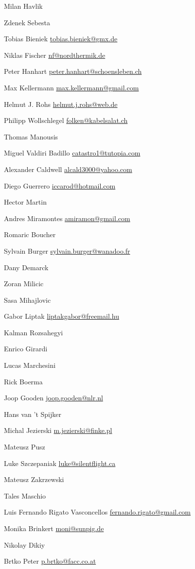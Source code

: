 \item Milan Havlik
\item*Zdenek Sebesta
\item Tobias Bieniek \url{tobias.bieniek@gmx.de}
\item Niklas Fischer \url{nf@nordthermik.de}
\item Peter Hanhart \url{peter.hanhart@schoensleben.ch}
\item Max Kellermann \url{max.kellermann@gmail.com}
\item Helmut J. Rohs \url{helmut.j.rohs@web.de}
\item Philipp Wollschlegel \url{folken@kabelsalat.ch}
\item*Thomas Manousis
\item Miguel Valdiri Badillo \url{catastro1@tutopia.com}
\item Alexander Caldwell \url{alcald3000@yahoo.com}
\item Diego Guerrero \url{iccarod@hotmail.com}
\item*Hector Martin
\item Andres Miramontes \url{amiramon@gmail.com}
\item*Romaric Boucher
\item Sylvain Burger \url{sylvain.burger@wanadoo.fr}
\item*Dany Demarck
\item*Zoran Milicic
\item*Sasa Mihajlovic
\item Gabor Liptak \url{liptakgabor@freemail.hu}
\item*Kalman Rozsahegyi
\item*Enrico Girardi
\item*Lucas Marchesini
\item*Rick Boerma
\item Joop Gooden \url{joop.gooden@nlr.nl}
\item Hans van 't Spijker
\item Michal Jezierski \url{m.jezierski@finke.pl}
\item*Mateusz Pusz
\item Luke Szczepaniak \url{luke@silentflight.ca}
\item Mateusz Zakrzewski
\item*Tales Maschio
\item Luis Fernando Rigato Vasconcellos \url{fernando.rigato@gmail.com}
\item Monika Brinkert \url{moni@sunpig.de}
\item Nikolay Dikiy
\item Brtko Peter \url{p.brtko@facc.co.at}
